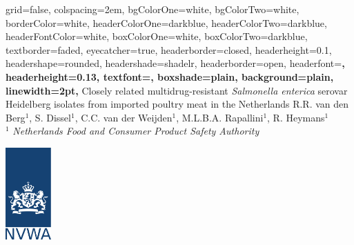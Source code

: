 \documentclass[portrait,a0paper,fontscale=0.31]{baposter}
\newcommand{\senterica}{\textit{Salmonella enterica} serovar Heidelberg }
\newcommand{\fcite}[2]{#1$^#2$}
\newcommand{\mdr}{multidrug-resistant }
\begin{document}


\begin{poster}%
  {
  grid=false,
  colspacing=2em,
  bgColorOne=white,
  bgColorTwo=white,
  borderColor=white,
  headerColorOne=darkblue,
  headerColorTwo=darkblue,
  headerFontColor=white,
  boxColorOne=white,
  boxColorTwo=darkblue,
  textborder=faded,
  eyecatcher=true,
  headerborder=closed,
  headerheight=0.1\textheight,
  headershape=rounded,
  headershade=shadelr,
  headerborder=open,
  headerfont=\Large\sf\bf, %
  headerheight=0.13\textheight,
  textfont={\setlength{\parindent}{1.5em}},
  boxshade=plain,
  background=plain,
  linewidth=2pt,
  }
  {}
  {
    {
      Closely related \mdr \senterica isolates from imported poultry meat in the Netherlands
    }
  }
  {
    {\fcite{R.R. van den Berg}{1}, \fcite{S. Dissel}{1}, \fcite{C.C. van der Weijden}{1}, \fcite{M.L.B.A. Rapallini}{1}, \fcite{R. Heymans}{1}\\{\smaller $^1$ \textit{Netherlands Food and Consumer Product Safety Authority} }}
  }
  {\parbox[top][12em][t]{5em}{\includegraphics[height=9.5em]{images/rijksoverheid4.png}}} 


\end{poster}
\end{document}
